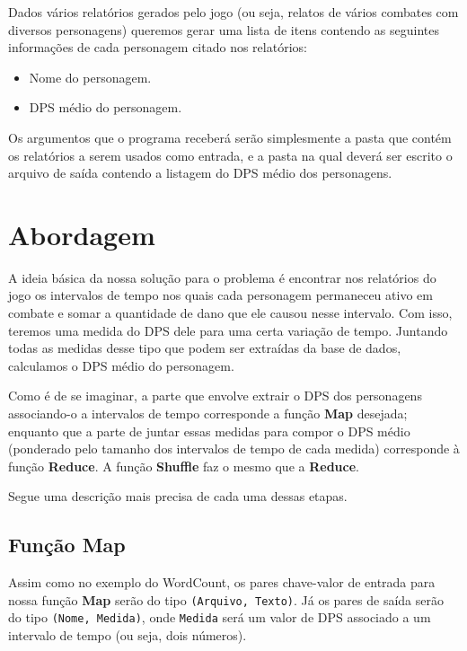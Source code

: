 \documentclass[a4paper,11pt]{article}
\begin{document}
  Dados vários relatórios gerados pelo jogo (ou seja, relatos de vários combates
  com diversos personagens) queremos gerar uma lista de itens contendo as
  seguintes informações de cada personagem citado nos relatórios:
  
  \begin{itemize}
  
    \item Nome do personagem.
    \item DPS médio do personagem.
  
  \end{itemize}
  
  Os argumentos que o programa receberá serão simplesmente a pasta que contém os
  relatórios a serem usados como entrada, e a pasta na qual deverá ser escrito o
  arquivo de saída contendo a listagem do DPS médio dos personagens.

\section{Abordagem}

  A ideia básica da nossa solução para o problema é encontrar nos relatórios do
  jogo os intervalos de tempo nos quais cada personagem permaneceu ativo em
  combate e somar a quantidade de dano que ele causou nesse intervalo. Com isso,
  teremos uma medida do DPS dele para uma certa variação de tempo. Juntando
  todas as medidas desse tipo que podem ser extraídas da base de dados,
  calculamos o DPS médio do personagem.
  
  Como é de se imaginar, a parte que envolve extrair o DPS dos personagens
  associando-o a intervalos de tempo corresponde a função \textbf{Map} desejada;
  enquanto que a parte de juntar essas medidas para compor o DPS médio
  (ponderado pelo tamanho dos intervalos de tempo de cada medida) corresponde à
  função \textbf{Reduce}. A função \textbf{Shuffle} faz o mesmo que a
  \textbf{Reduce}.
  
  Segue uma descrição mais precisa de cada uma dessas etapas.
  
  \subsection{Função \textbf{Map}}
  
    Assim como no exemplo do WordCount, os pares chave-valor de entrada para
    nossa função \textbf{Map} serão do tipo \verb$(Arquivo, Texto)$. Já os
    pares de saída serão do tipo \verb$(Nome, Medida)$, onde \verb$Medida$ será
    um valor de DPS associado a um intervalo de tempo (ou seja, dois números).
    
\end{document}
